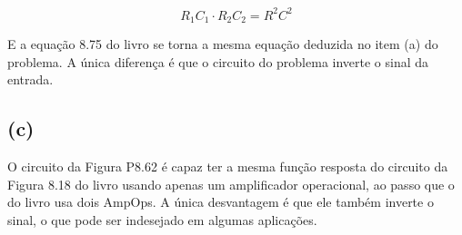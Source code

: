 \[ R_1C_1 \cdot R_2C_2 = R^2C^2 \]

E a equação 8.75 do livro se torna a mesma equação deduzida no item (a) do problema. A única diferença é que o circuito 
do problema inverte o sinal da entrada. 

\subsection*{(c)}

O circuito da Figura P8.62 é capaz ter a mesma função resposta do circuito da Figura 8.18 do livro usando apenas um 
amplificador operacional, ao passo que o do livro usa dois AmpOps. A única desvantagem é que ele também inverte o sinal, o que
pode ser indesejado em algumas aplicações.
